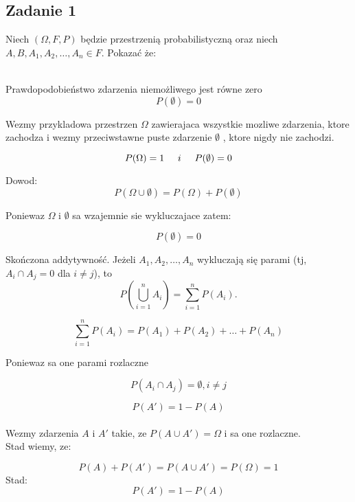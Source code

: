\subsection{Zadanie 1}

Niech $(\Omega, F ,P)$ będzie przestrzenią probabilistyczną oraz niech \\ $A,B, A_1,A_2, \ldots, A_n \in F$. Pokazać że:\\ \\

\medskip
{} 
\medskip

Prawdopodobieństwo zdarzenia niemożliwego jest równe zero
$$
P(\emptyset) = 0
$$

Wezmy przykladowa przestrzen $\Omega$ zawierajaca wszystkie mozliwe zdarzenia, ktore zachodza i wezmy przeciwstawne puste zdarzenie $\emptyset$ , ktore nigdy nie zachodzi.


$$ P(\Omega) = 1 \hspace{0.5cm} i \hspace{0.5cm}  P(\emptyset) = 0 $$

Dowod: \\

$$P(\Omega \cup \emptyset) = P(\Omega) + P(\emptyset)$$

Poniewaz $\Omega$ i $\emptyset$ sa wzajemnie sie wykluczajace zatem: 

$$ P(\emptyset) = 0 $$

\medskip
{} 
\medskip


Skończona addytywność. Jeżeli $A_1,A_2, \ldots, A_n$ wykluczają się parami (tj, $A_i \cap A_j = 0$ dla $i \neq j$), to
$$
P\left(\bigcup_{i=1}^{n} A_i \right) = \sum_{i=1}^{n} P(A_i).
$$

$$\sum_{i=1}^{n} P(A_i) = P(A_1) + P(A_2) + \ldots + P(A_n)$$

Poniewaz sa one parami rozlaczne 

$$ P(A_i \cap A_j) = \emptyset , i \neq j$$

\medskip
{} 
\medskip

$$
P(A') = 1 - P(A)
$$\\

Wezmy zdarzenia $A$ i $A'$ takie, ze $P(A \cup A') = \Omega$ i sa one rozlaczne.\\

Stad wiemy, ze:

$$P(A) + P(A') = P(A \cup A') = P(\Omega) = 1$$
Stad:
$$P(A') = 1 - P(A)$$


\medskip
{} 
\medskip

